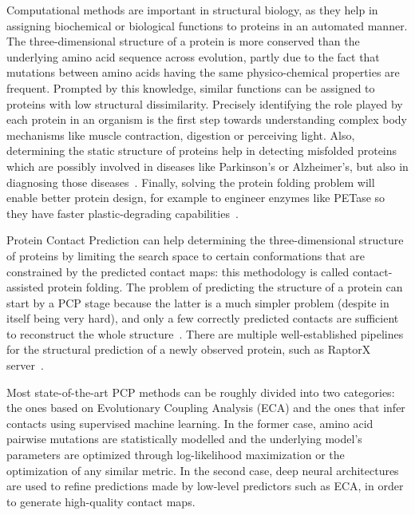     Computational methods are important in structural biology,
    as they help in assigning biochemical or biological functions to proteins
    in an automated manner.
    The three-dimensional structure of a protein is more conserved than the
    underlying amino acid sequence across evolution, partly due to the fact that
    mutations between amino acids having the same physico-chemical properties are frequent.
    Prompted by this knowledge, similar functions
    can be assigned to proteins with low structural dissimilarity.
    Precisely identifying the role played by each protein in an organism is the first step
    towards understanding complex body mechanisms like muscle contraction, digestion or perceiving light.
    Also, determining the static structure of proteins help in detecting misfolded proteins
    which are possibly involved in diseases like Parkinson's or
    Alzheimer's, but also in diagnosing those diseases~\cite{forloni2002protein}.
    Finally, solving the protein folding problem will enable
    better protein design, for example to engineer enzymes like PETase
    so they have faster plastic-degrading capabilities~\cite{DeepMind}.

    Protein Contact Prediction can help determining the three-dimensional structure of
    proteins by limiting the search space to certain conformations that are
    constrained by the predicted contact maps: this methodology is called contact-assisted protein folding.
    The problem of predicting the structure of a protein can start by a PCP stage because the latter is a much simpler problem
    (despite in itself being very hard), and only a few correctly predicted contacts
    are sufficient to reconstruct the whole structure~\cite{kim2014one}.
    There are multiple well-established pipelines for the structural prediction of a newly
    observed protein, such as RaptorX server~\cite{peng2011raptorx}.

    Most state-of-the-art PCP methods can be roughly divided into two categories:
    the ones based on Evolutionary Coupling Analysis (ECA) and the ones that infer contacts using
    supervised machine learning. In the former case, amino acid pairwise mutations
    are statistically modelled and the underlying model's parameters
    are optimized through log-likelihood maximization or the optimization of any similar metric.
    In the second case, deep neural architectures are used to
    refine predictions made by low-level predictors such as ECA, in order to generate high-quality contact maps.

